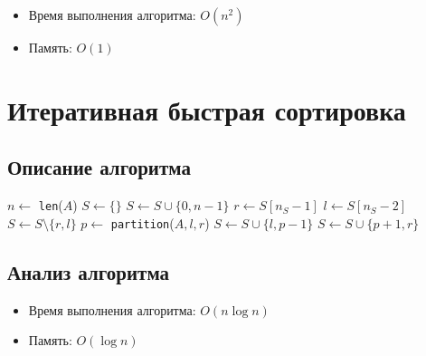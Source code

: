 \begin{itemize}
\item Время выполнения алгоритма: $O(n^2)$
\item Память: $O(1)$
\end{itemize}

\section{Итеративная быстрая сортировка}

\subsection{Описание алгоритма}

\begin{algorithmic}
\State $n \gets$ \texttt{len}($A$)
\State $S \gets \{\}$ 
\State $S \gets S \cup \{0, n - 1\}$
\State $r \gets S[n_S - 1]$
\State $l \gets S[n_S - 2]$
\State $S \gets S \setminus \{r, l\}$
\State $p \gets$ \texttt{partition}($A, l, r$)
\State $S \gets S \cup \{l, p - 1\}$
\State $S \gets S \cup \{p + 1, r\}$
\EndWhile
\EndProcedure
\end{algorithmic}

\subsection{Анализ алгоритма}

\begin{itemize}
\item Время выполнения алгоритма: $O(n \log n)$
\item Память: $O(\log n)$
\end{itemize}
